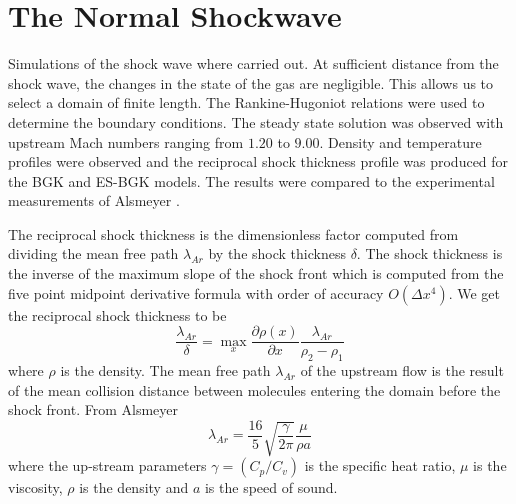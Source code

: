 \section{The Normal Shockwave}
Simulations of the shock wave where carried out. At sufficient distance from the shock wave, the changes in the state of the gas are negligible. This allows us to select a domain of finite length. The Rankine-Hugoniot relations \cite{roshko} were used to determine the boundary conditions. The steady state solution was observed with upstream Mach numbers ranging from $1.20$ to $9.00$. Density and temperature profiles were observed and the reciprocal shock thickness profile was produced for the BGK and ES-BGK models. The results were compared to the experimental measurements of Alsmeyer \cite{alsmeyer}.

The reciprocal shock thickness is the dimensionless factor computed from dividing the mean free path $\lambda_{Ar}$ by the shock thickness $\delta$. The shock thickness is the inverse of the maximum slope of the shock front which is computed from the five point midpoint derivative formula with order of accuracy $O(\Delta x^4)$. We get the reciprocal shock thickness to be
%
\begin{equation}
\label{recipThick}
\frac{\lambda_{Ar}}{\delta} = \max_x \frac{\partial \rho(x)}{\partial x} \frac{\lambda_{Ar}}{\rho_2 - \rho_1}
\end{equation}
%
where $\rho$ is the density. The mean free path $\lambda_{Ar}$ of the upstream flow is the result of the mean collision distance between molecules entering the domain before the shock front. From Alsmeyer \cite{alsmeyer}
%
\begin{equation}
\lambda_{Ar} = \frac{16}{5} \sqrt{\frac{\gamma}{2 \pi}} \frac{\mu}{\rho a}
\end{equation}
%
where the up-stream parameters $\gamma = (C_p/C_v)$ is the specific heat ratio, $\mu$ is the viscosity, $\rho$ is the density and $a$ is the speed of sound.
%
